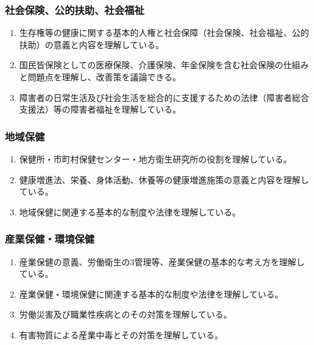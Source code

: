 \hypertarget{ux793eux4f1aux4fddux967aux516cux7684ux6276ux52a9ux793eux4f1aux798fux7949}{%
\subsubsection{社会保険、公的扶助、社会福祉}\label{ux793eux4f1aux4fddux967aux516cux7684ux6276ux52a9ux793eux4f1aux798fux7949}}

\begin{enumerate}
\def\labelenumi{\arabic{enumi}.}
\tightlist
\item
  生存権等の健康に関する基本的人権と社会保障（社会保険、社会福祉、公的扶助）の意義と内容を理解している。
\item
  国民皆保険としての医療保険、介護保険、年金保険を含む社会保険の仕組みと問題点を理解し、改善策を議論できる。
\item
  障害者の日常生活及び社会生活を総合的に支援するための法律（障害者総合支援法）等の障害者福祉を理解している。
\end{enumerate}

\hypertarget{ux5730ux57dfux4fddux5065}{%
\subsubsection{地域保健}\label{ux5730ux57dfux4fddux5065}}

\begin{enumerate}
\def\labelenumi{\arabic{enumi}.}
\tightlist
\item
  保健所・市町村保健センター・地方衛生研究所の役割を理解している。
\item
  健康増進法、栄養、身体活動、休養等の健康増進施策の意義と内容を理解している。
\item
  地域保健に関連する基本的な制度や法律を理解している。
\end{enumerate}

\hypertarget{ux7523ux696dux4fddux5065ux74b0ux5883ux4fddux5065}{%
\subsubsection{産業保健・環境保健}\label{ux7523ux696dux4fddux5065ux74b0ux5883ux4fddux5065}}

\begin{enumerate}
\def\labelenumi{\arabic{enumi}.}
\tightlist
\item
  産業保健の意義、労働衛生の3管理等、産業保健の基本的な考え方を理解している。
\item
  産業保健・環境保健に関連する基本的な制度や法律を理解している。
\item
  労働災害及び職業性疾病とのその対策を理解している。
\item
  有害物質による産業中毒とその対策を理解している。
\end{enumerate}

